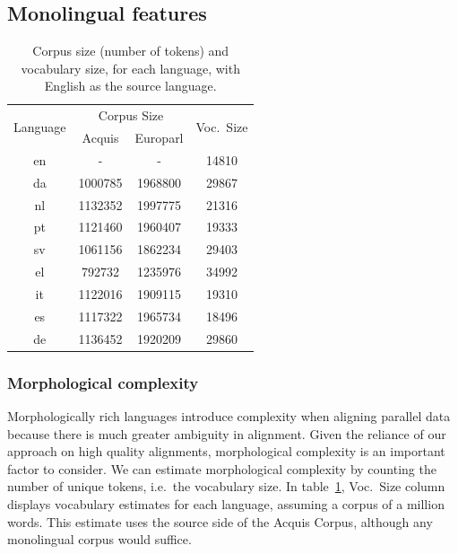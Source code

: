 \subsection{Monolingual features}
\begin{table}
\small
\centering
    \begin{tabular}{cccc}
   \multirow{2}{*}{Language} &  \multicolumn{2}{c}{Corpus Size}  & \multirow{2}{*}{Voc.\ Size} \\\cline{2-3}
         &  Acquis & Europarl &  \\\hline
    en              & - &  -       & 14810           \\
    da              & 1000785 &  1968800       & 29867           \\
    nl              & 1132352 &  1997775          & 21316           \\
    pt              & 1121460 &  1960407           & 19333           \\
    sv              & 1061156 &  1862234          & 29403           \\
    el              & 792732  &  1235976          & 34992           \\
    it              & 1122016 &  1909115          & 19310           \\
    es              & 1117322 &  1965734         & 18496           \\
    de              & 1136452 &  1920209          & 29860           \\
    \end{tabular}
    \caption{Corpus size (number of tokens) and vocabulary size, for
      each language, with English as the source language.}
    \label{tbl:corpsizeVocSize}
\end{table}


\subsubsection{Morphological complexity} 

Morphologically rich languages introduce complexity when aligning parallel data because there is much greater ambiguity in alignment. Given the reliance of our approach on high quality alignments, morphological complexity is an important factor to consider. We can estimate morphological complexity by counting the number of unique tokens, i.e.\ the vocabulary size. In table~\ref{tbl:corpsizeVocSize}, Voc.\ Size column displays vocabulary estimates for each language, assuming a corpus of a million words. This estimate uses the source side of the Acquis Corpus, although any monolingual corpus would suffice.  

